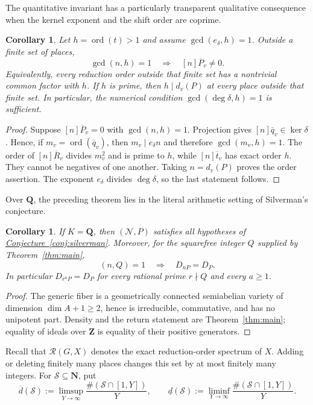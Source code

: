 \documentclass[11pt,letterpaper,reqno]{amsart}
\newtheorem{corollary}[theorem]{Corollary}
\theoremstyle{definition}
\theoremstyle{remark}
\newcommand{\Q}{\mathbf Q}
\newcommand{\Z}{\mathbf Z}
\newcommand{\N}{\mathbf N}
\newcommand{\ord}{\operatorname{ord}}
\newcommand{\Ner}{\mathcal N}
\newcommand{\SilvermanConj}{\hyperref[conj:silverman]{Conjecture~\ref*{conj:silverman}}}
\begin{document}
The quantitative invariant has a particularly transparent qualitative
consequence when the kernel exponent and the shift order are coprime.

\begin{corollary}\label{cor:coprime-obstruction}
Let $h=\ord(t)>1$ and assume $\gcd(e_\delta,h)=1$.  Outside a finite set of
places,
\[
 \gcd(n,h)=1\quad\Longrightarrow\quad[n]\overline P_v\ne0.
\]
Equivalently, every reduction order outside that finite set has a nontrivial
common factor with $h$.  If $h$ is prime, then $h\mid d_v(P)$ at every place
outside that finite set.  In particular, the numerical condition $\gcd(\deg\delta,h)=1$ is sufficient.
\end{corollary}

\begin{proof}
Suppose $[n]\overline P_v=0$ with $\gcd(n,h)=1$.  Projection gives
$[n]\overline q_v\in\ker\delta$.  Hence, if
$m_v=\ord(\overline q_v)$, then $m_v\mid e_\delta n$ and therefore
$\gcd(m_v,h)=1$.  The order of $[n]\overline R_v$ divides $m_v^2$ and is
prime to $h$, while $[n]\overline t_v$ has exact order $h$.  They cannot be
negatives of one another.  Taking $n=d_v(P)$ proves the order assertion.  The
exponent $e_\delta$ divides $\deg\delta$, so the last statement follows.
\end{proof}

Over $\Q$, the preceding theorem lies in the literal arithmetic setting of
Silverman's conjecture.

\begin{corollary}
\label{cor:silverman}
If $K=\Q$, then $(\Ner,P)$ satisfies all hypotheses of \SilvermanConj{}.
Moreover, for the squarefree integer $Q$ supplied by Theorem~\ref{thm:main},
\[
 (n,Q)=1\quad\Longrightarrow\quad D_{nP}=D_P.
\]
In particular $D_{r^{a}P}=D_P$ for every rational prime $r\nmid Q$ and every
$a\ge1$.
\end{corollary}

\begin{proof}
The generic fiber is a geometrically connected semiabelian variety of
dimension $\dim A+1\ge2$, hence is irreducible, commutative, and has no
unipotent part.  Density and the return statement are Theorem~\ref{thm:main}; equality
of ideals over $\Z$ is equality of their positive generators.
\end{proof}

Recall that $\mathscr R(G,X)$ denotes the exact reduction-order spectrum of
$X$.  Adding or deleting finitely many places changes this set by at most
finitely many integers.  For $\mathscr S\subseteq\N$, put
\[
 \overline d(\mathscr S)
 :=\limsup_{Y\to\infty}\frac{\#(\mathscr S\cap[1,Y])}{Y},
 \qquad
 \underline d(\mathscr S)
 :=\liminf_{Y\to\infty}\frac{\#(\mathscr S\cap[1,Y])}{Y}.
\]
\end{document}
